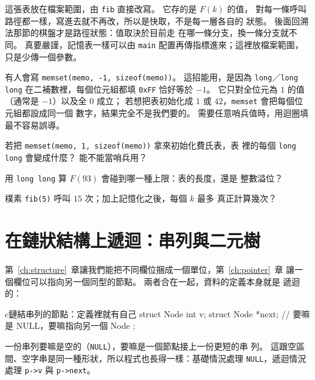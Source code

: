 這張表放在檔案範圍，由 \texttt{fib} 直接改寫。 它存的是 $F(k)$ 的值，
對每一條呼叫路徑都一樣，寫進去就不再改，所以是快取，不是每一層各自的
狀態。 後面回溯法那節的棋盤才是路徑狀態：值取決於目前走
在哪一條分支，換一條分支就不同。 真要嚴謹，記憶表一樣可以由
\texttt{main} 配置再傳指標進來；這裡放檔案範圍，只是少傳一個參數。

有人會寫 \texttt{memset(memo, -1, sizeof(memo))}。 這招能用，是因為
\texttt{long}／\texttt{long long} 在二補數裡，每個位元組都填 \texttt{0xFF}
恰好等於 $-1$。 它只對全位元為 $1$ 的值（通常是 $-1$）以及全 $0$ 成立；
若想把表初始化成 $1$ 或 $42$，\texttt{memset} 會把每個位元組都設成同一個
數字，結果完全不是我們要的。 需要任意哨兵值時，用迴圈填最不容易誤導。



\begin{drills}[label=drills:rec-memo]
\item 若把 \texttt{memset(memo, 1, sizeof(memo))} 拿來初始化費氏表，表
裡的每個 \texttt{long long} 會變成什麼？ 能不能當哨兵用？
\item 用 \texttt{long long} 算 $F(93)$ 會碰到哪一種上限：表的長度，還是
整數溢位？
\item 樸素 \texttt{fib(5)} 呼叫 $15$ 次；加上記憶化之後，每個 $k$ 最多
真正計算幾次？
\end{drills}

\section{在鏈狀結構上遞迴：串列與二元樹}
\label{sec:rec-list}

第~\ref{ch:structure}~章讓我們能把不同欄位捆成一個單位，第~\ref{ch:pointer}~章
讓一個欄位可以指向另一個同型的節點。 兩者合在一起，資料的定義本身就是
遞迴的：

\begin{code}{c}{鏈結串列的節點：定義裡就有自己}
struct Node {
    int v;
    struct Node *next;   // 要嘛是 NULL，要嘛指向另一個 Node
};
\end{code}

一份串列要嘛是空的（\texttt{NULL}），要嘛是一個節點接上一份更短的串
列。 這跟空區間、空字串是同一種形狀，所以程式也長得一樣：基礎情況處理
\texttt{NULL}，遞迴情況處理 \texttt{p->v} 與 \texttt{p->next}。

